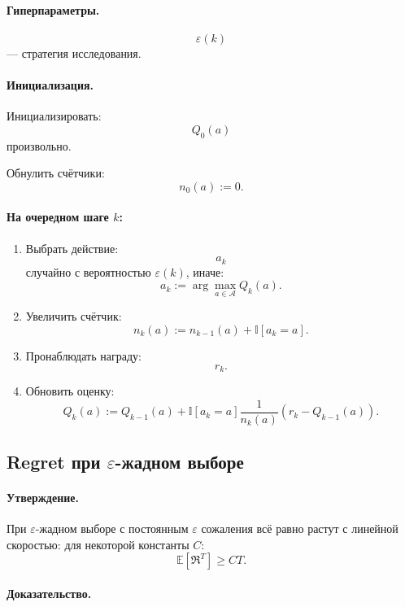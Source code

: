 \documentclass[12pt,a4paper]{article}
\begin{document}
\paragraph{Гиперпараметры.}

\[
\varepsilon(k)
\]
--- стратегия исследования.

\paragraph{Инициализация.}

Инициализировать:
\[
Q_0(a)
\]
произвольно.

Обнулить счётчики:
\[
n_0(a):=0.
\]

\paragraph{На очередном шаге $k$:}

\begin{enumerate}
    \item Выбрать действие:
    \[
    a_k
    \]
    случайно с вероятностью $\varepsilon(k)$, иначе:
    \[
    a_k
    :=
    \arg\max_{a\in\mathcal A}
    Q_k(a).
    \]

    \item Увеличить счётчик:
    \[
    n_k(a)
    :=
    n_{k-1}(a)
    +
    \mathbb I[a_k=a].
    \]

    \item Пронаблюдать награду:
    \[
    r_k.
    \]

    \item Обновить оценку:
    \[
    Q_k(a)
    :=
    Q_{k-1}(a)
    +
    \mathbb I[a_k=a]
    \frac{1}{n_k(a)}
    \left(
    r_k-Q_{k-1}(a)
    \right).
    \]
\end{enumerate}

\subsection{Regret при $\varepsilon$-жадном выборе}

\paragraph{Утверждение.}

При $\varepsilon$-жадном выборе с постоянным $\varepsilon$ сожаления всё равно растут с линейной скоростью: для некоторой константы $C$:
\[
\mathbb E
\left[
\mathfrak R^T
\right]
\ge
CT.
\]

\paragraph{Доказательство.}
\end{document}
